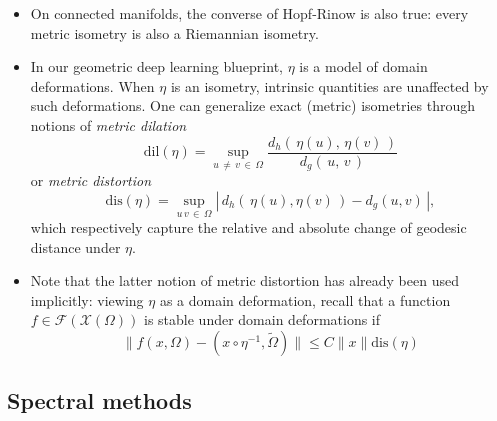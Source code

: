 \documentclass[12pt]{article}
\numberwithin{equation}{section}
\theoremstyle{definition}
\newcommand{		\cX		}	{	\mathcal{X}				}
\newcommand{		\Oh		}	{	\Omega					}
\newcommand{		\1		}	{	\bm{1}					}%
\begin{document}
\begin{itemize}
\item On connected manifolds, the converse of Hopf-Rinow is also true: every metric isometry is also a Riemannian isometry. 

\item In our geometric deep learning blueprint, $\eta$ is a model of domain deformations. When $\eta$ is an isometry, intrinsic quantities are unaffected by such deformations. One can generalize exact (metric) isometries through notions of \emph{metric dilation}
$$
\textrm{dil}(\eta) = \sup_{u\, \neq\, v \, \in \,\Oh } \frac{ d_h ( \, \eta(u), \,\eta(v) \, ) }{d_g(\,u,\,v\,)} 
$$
or \emph{metric distortion}
$$
\textrm{dis}(\eta) = 
	\sup_{u\, v \, \in \, \Oh } 
		\left| \, d_h(\, \eta(u), \eta(v) \,) - d_g (u,v) \, \right|,
$$
which respectively capture the relative and absolute change of geodesic distance under $\eta$. 

\item Note that the latter notion of metric distortion has already been used implicitly: viewing $\eta$ as a domain deformation, recall that a function $f \in \mathcal{F}(\cX(\Oh))$ is stable under domain deformations if 
$$
\| f(x, \Oh) - (x \circ \eta^{-1}, \tilde{\Oh} ) \| \leq C \| x \| \textrm{dis}(\eta)
$$

\end{itemize} 

\subsection{Spectral methods}
\hrulefill
\end{document}
